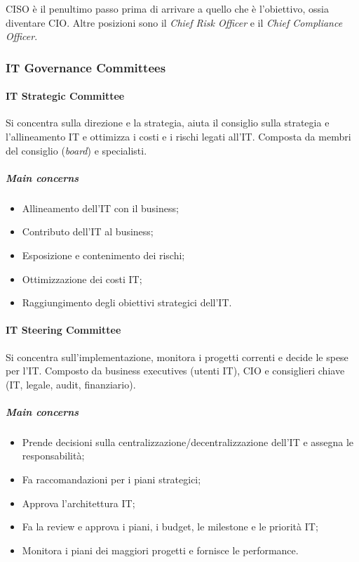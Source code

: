 CISO è il penultimo passo prima di arrivare a quello che è l'obiettivo, ossia
diventare CIO. Altre posizioni sono il \textit{Chief Risk Officer} e il
\textit{Chief Compliance Officer}.

\subsubsection{IT Governance Committees}

\paragraph{IT Strategic Committee}

Si concentra sulla direzione e la strategia, aiuta il consiglio sulla strategia
e l'allineamento IT e ottimizza i costi e i rischi legati all'IT. Composta da
membri del consiglio (\textit{board}) e specialisti.

\subparagraph*{Main concerns}

\begin{itemize}
\item Allineamento dell'IT con il business;
\item Contributo dell'IT al business;
\item Esposizione e contenimento dei rischi;
\item Ottimizzazione dei costi IT;
\item Raggiungimento degli obiettivi strategici dell'IT.
\end{itemize}

\paragraph{IT Steering Committee}

Si concentra sull'implementazione, monitora i progetti correnti e decide le
spese per l'IT. Composto da business executives (utenti IT), CIO e consiglieri
chiave (IT, legale, audit, finanziario).

\subparagraph*{Main concerns}

\begin{itemize}
\item Prende decisioni sulla centralizzazione/decentralizzazione dell'IT e
assegna le responsabilità;
\item Fa raccomandazioni per i piani strategici;
\item Approva l'architettura IT;
\item Fa la review e approva i piani, i budget, le milestone e le priorità IT;
\item Monitora i piani dei maggiori progetti e fornisce le performance.
\end{itemize}

